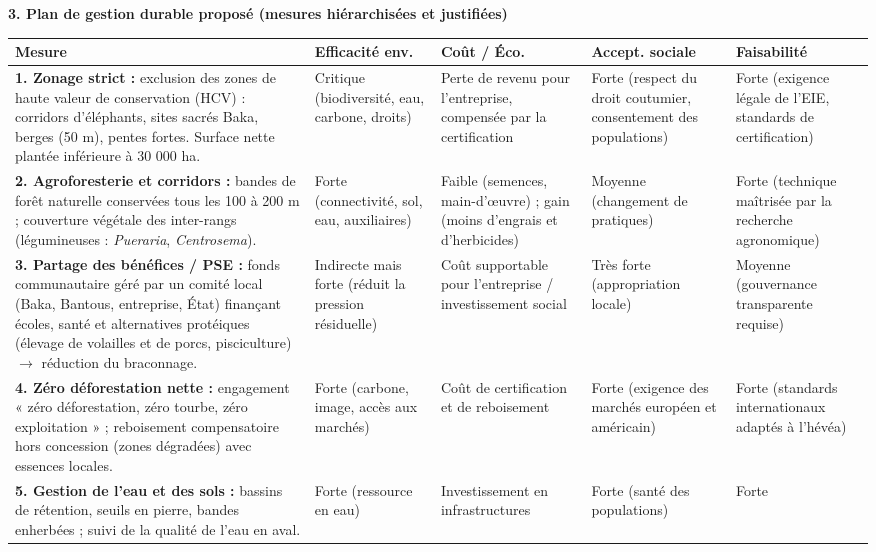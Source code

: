 \documentclass[11pt]{article}
\begin{document}
\begin{exoresolu}
\textbf{3. Plan de gestion durable proposé (mesures hiérarchisées et justifiées)}\par
\begin{center}
\begin{tabularx}{\linewidth}{|l|X|X|X|X|}\hline
\rowcolor{popblueL}\textbf{Mesure} & \textbf{Efficacité env.} & \textbf{Coût / Éco.} & \textbf{Accept. sociale} & \textbf{Faisabilité} \\ \hline
\textbf{1. Zonage strict :} exclusion des zones de haute valeur de conservation (HCV) : corridors d'éléphants, sites sacrés Baka, berges (50 m), pentes fortes. Surface nette plantée inférieure à 30 000 ha. & Critique (biodiversité, eau, carbone, droits) & Perte de revenu pour l'entreprise, compensée par la certification & Forte (respect du droit coutumier, consentement des populations) & Forte (exigence légale de l'EIE, standards de certification) \\ \hline
\textbf{2. Agroforesterie et corridors :} bandes de forêt naturelle conservées tous les 100 à 200 m ; couverture végétale des inter-rangs (légumineuses : \emph{Pueraria}, \emph{Centrosema}). & Forte (connectivité, sol, eau, auxiliaires) & Faible (semences, main-d'œuvre) ; gain (moins d'engrais et d'herbicides) & Moyenne (changement de pratiques) & Forte (technique maîtrisée par la recherche agronomique) \\ \hline
\textbf{3. Partage des bénéfices / PSE :} fonds communautaire géré par un comité local (Baka, Bantous, entreprise, État) finançant écoles, santé et alternatives protéiques (élevage de volailles et de porcs, pisciculture) $\rightarrow$ réduction du braconnage. & Indirecte mais forte (réduit la pression résiduelle) & Coût supportable pour l'entreprise / investissement social & Très forte (appropriation locale) & Moyenne (gouvernance transparente requise) \\ \hline
\textbf{4. Zéro déforestation nette :} engagement « zéro déforestation, zéro tourbe, zéro exploitation » ; reboisement compensatoire hors concession (zones dégradées) avec essences locales. & Forte (carbone, image, accès aux marchés) & Coût de certification et de reboisement & Forte (exigence des marchés européen et américain) & Forte (standards internationaux adaptés à l'hévéa) \\ \hline
\textbf{5. Gestion de l'eau et des sols :} bassins de rétention, seuils en pierre, bandes enherbées ; suivi de la qualité de l'eau en aval. & Forte (ressource en eau) & Investissement en infrastructures & Forte (santé des populations) & Forte \\ \hline
\end{tabularx}
\end{center}


\end{exoresolu}
\end{document}
